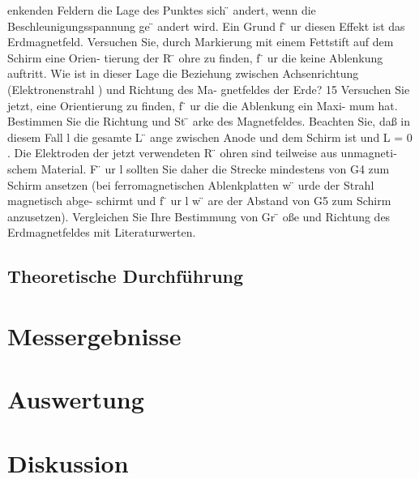 \documentclass[12pt]{scrartcl}
\begin{document}
\begin{enumerate}[(a)]
\begin{enumerate}
enkenden Feldern
die Lage des Punktes sich
̈
andert, wenn die Beschleunigungsspannung ge
̈
andert
wird. Ein Grund f
̈
ur diesen Effekt ist das Erdmagnetfeld.
Versuchen Sie, durch Markierung mit einem Fettstift auf dem
Schirm eine Orien-
tierung der R
̈
ohre zu finden, f
̈
ur die keine Ablenkung auftritt. Wie ist in dieser Lage
die Beziehung zwischen Achsenrichtung (Elektronenstrahl
) und Richtung des Ma-
gnetfeldes der Erde?
15
Versuchen Sie jetzt, eine Orientierung zu finden, f
̈
ur die die Ablenkung ein Maxi-
mum hat. Bestimmen Sie die Richtung und St
̈
arke des Magnetfeldes. Beachten Sie,
daß in diesem Fall
l
die gesamte L
̈
ange zwischen Anode und dem Schirm ist und
L
= 0
. Die Elektroden der jetzt verwendeten R
̈
ohren sind teilweise aus unmagneti-
schem Material. F
̈
ur
l
sollten Sie daher die Strecke mindestens von G4 zum Schirm
ansetzen (bei ferromagnetischen Ablenkplatten w
̈
urde der Strahl magnetisch abge-
schirmt und f
̈
ur
l
w
̈
are der Abstand von G5 zum Schirm anzusetzen).
Vergleichen Sie Ihre Bestimmung von Gr
̈
oße und Richtung des Erdmagnetfeldes
mit Literaturwerten.
\end{enumerate}


\end{enumerate}

\subsection{Theoretische Durchführung}


\section{Messergebnisse}



\section{Auswertung}


\section{Diskussion}


\end{document}
